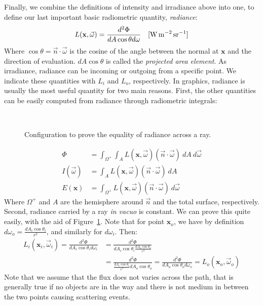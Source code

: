 Finally, we combine the definitions of intensity and irradiance above into one, to define our last important basic radiometric quantity, \emph{radiance}:
\begin{equation*}
L(\mathbf{x}, \vec{\omega}) = \frac{d^2 \Phi}{dA \cos\theta d \omega}  \siunit{\watt \per \square \metre \per \steradian}
\end{equation*}
Where $\cos \theta = \vec{n} \cdot \vec{\omega}$ is the cosine of the angle between the normal at $\mathbf{x}$ and the direction of evaluation. $dA \cos\theta$ is called the \emph{projected area element}. As irradiance, radiance can be incoming or outgoing from a specific point. We indicate these quantities with $L_i$ and $L_o$, respectively. In graphics, radiance is usually the most useful quantity for two main reasons. First, the other quantities can be easily computed from radiance through radiometric integrals:
\begin{figure}
\centering
   \def\svgwidth{0.8\textwidth}
    \\
\caption{Configuration to prove the equality of radiance across a ray.} %
\label{fig:etendue}
\end{figure}
\begin{equation*}
\begin{split}
\Phi &= \int_{\Omega^+} \int_{A} L(\mathbf{x}, \vec{\omega})  (\vec{n} \cdot \vec{\omega}) \ dA \ d \vec{\omega} \\
I(\vec{\omega}) &= \int_{A} L(\mathbf{x}, \vec{\omega})  (\vec{n} \cdot \vec{\omega}) \ dA  \\
E(\mathbf{x}) &= \int_{\Omega^+} L(\mathbf{x}, \vec{\omega})  (\vec{n} \cdot \vec{\omega}) \ d \vec{\omega} 
\end{split}
\end{equation*}
Where $\Omega^+$ and $A$ are the hemisphere around $\vec{n}$ and the total surface, respectively. Second, radiance carried by a ray \emph{in vacuo} is constant. We can prove this quite easily, with the aid of Figure~\ref{fig:etendue}. Note that for point $\mathbf{x}_o$, we have by definition $d \omega_o = \frac{d A_i \cos\theta_i}{r^2}$, and similarly  for $d \omega_i$. Then:
\begin{equation*}
\begin{split}
L_i(\mathbf{x}_i, \vec{\omega}_i) = \frac{d^2 \Phi}{d A_i \cos\theta_i d \omega_i} &= 
\frac{d^2 \Phi}{d A_i \cos\theta_i \frac{d A_o \cos\theta_o}{r^2}}  
\\ &= \frac{d^2 \Phi}{\frac{d A_i \cos\theta_i}{r^2} d A_o \cos\theta_o } 
= \frac{d^2 \Phi}{d A_o \cos\theta_o d \omega_o} = L_o(\mathbf{x}_o, \vec{\omega}_o)
\end{split}
\end{equation*}
Note that we assume that the flux does not varies across the path, that is generally true if no objects are in the way and there is not medium in between the two points causing scattering events. 

